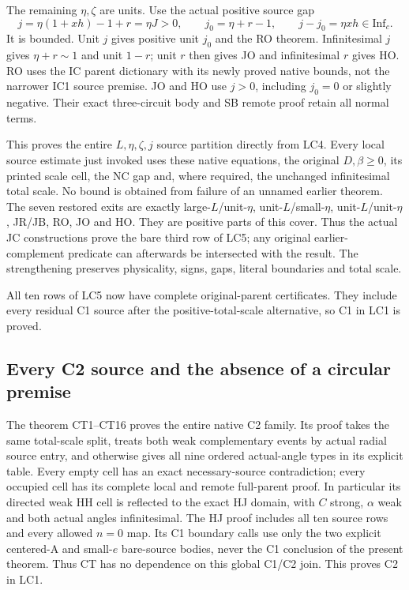 The remaining \(\eta,\zeta\) are units.  Use the
actual positive source gap
\[
 j=\eta(1+xh)-1+r=\eta J>0,\qquad
 j_0=\eta+r-1,\qquad j-j_0=\eta xh\in\mathrm{Inf}_c .
\tag{LC4c}
\]
It is bounded.  Unit \(j\) gives positive unit \(j_0\)
and the RO theorem.  Infinitesimal \(j\) gives
\(\eta+r\sim1\) and unit \(1-r\); unit \(r\) then gives
JO and infinitesimal \(r\) gives HO.
RO uses the IC parent dictionary with its newly proved
native bounds, not the narrower IC1 source premise.
JO and HO use \(j>0\), including \(j_0=0\) or slightly
negative.  Their exact three-circuit body and SB remote
proof retain all normal terms.

This proves the entire \(L,\eta,\zeta,j\) source
partition directly from LC4.  Every local source
estimate just invoked uses these native equations,
the original \(D,\beta\geq0\), its printed scale cell,
the NC gap and, where required, the unchanged
infinitesimal total scale.  No bound is obtained from
failure of an unnamed earlier theorem.
The seven restored exits are exactly large-\(L\)/unit-\(\eta\),
unit-\(L\)/small-\(\eta\), unit-\(L\)/unit-\(\eta\),
JR/JB, RO, JO and HO.  They are positive parts of this
cover.  Thus the actual JC constructions prove the
bare third row of LC5; any original earlier-complement
predicate can afterwards be intersected with the result.
The strengthening preserves physicality, signs, gaps,
literal boundaries and total scale.

All ten rows of LC5 now have complete original-parent
certificates.  They include every residual C1 source after
the positive-total-scale alternative, so C1 in LC1 is proved.

\subsection{Every C2 source and the absence of a circular premise}

The theorem CT1--CT16 proves the entire native C2 family.
Its proof takes the same total-scale split, treats both
weak complementary events by actual radial source entry,
and otherwise gives all nine ordered actual-angle types
in its explicit table.  Every empty cell has an exact
necessary-source contradiction; every occupied cell has
its complete local and remote full-parent proof.
In particular its directed weak HH cell is reflected to
the exact HJ domain, with \(C\) strong, \(\alpha\) weak
and both actual angles infinitesimal.
The HJ proof includes all ten source rows and every
allowed \(n=0\) map.  Its C1 boundary calls use only the
two explicit centered-A and small-\(e\) bare-source bodies,
never the C1 conclusion of the present theorem.
Thus CT has no dependence on this global C1/C2 join.
This proves C2 in LC1.

